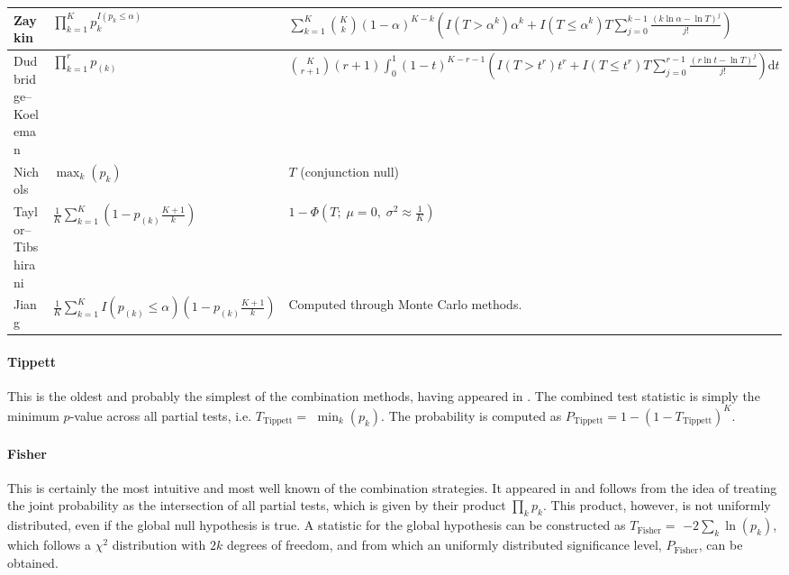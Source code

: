 \begin{sidewaystable}
\begin{center}
{\begin{tabular}{@{}m{3.6cm}@{}m{6.7cm}<{\raggedright}@{}m{12.2cm}<{\raggedright}@{}}
Zaykin &
$\prod_{k=1}^{K} p_{k}^{I\left(p_{k} \leqslant \alpha\right)}$ &
$\sum_{k=1}^{K}\binom{K}{k}\left(1-\alpha\right)^{K-k}\left(I\left(T> \alpha^{k}\right) \alpha^{k}  + I\left(T\leqslant \alpha^{k}\right)T\sum_{j=0}^{k-1}\frac{\left(k\ln \alpha - \ln T\right)^{j}}{j!}\right)$\\
\midrule[0pt]
Dudbridge--Koeleman &
$\prod_{k=1}^{r} p_{(k)}$ &
$\binom{K}{r+1}\left(r+1\right) \int_0^1\left(1-t\right)^{K-r-1}\left(I\left(T> t^{r}\right) t^{r} +I\left(T \leqslant t^{r}\right) T \sum_{j=0}^{r-1}\frac{\left(r\ln t - \ln T\right)^{j}}{j!}\right)\mathrm{d}t$ \\
\midrule[0pt]
Nichols &
$\max_{k} \left(p_{k}\right)$ &
$T$ (conjunction null)\\
\midrule[0pt]
Taylor--Tibshirani &
$\frac{1}{K} \sum_{k=1}^{K} \left(1-p_{(k)}\frac{K+1}{k}\right)$ &
$1-\Phi\left(T;\;\mu=0,\;\sigma^2 \approx \frac{1}{K}\right)$ \\
\midrule[0pt]
Jiang &
$\frac{1}{K} \sum_{k=1}^{K} I\left(p_{(k)}\leqslant \alpha \right)\left(1-p_{(k)}\frac{K+1}{k}\right)$ &
Computed through Monte Carlo methods.\\
\bottomrule
\end{tabular}}
\end{center}
\end{sidewaystable}

\paragraph{Tippett} This is the oldest and probably the simplest of the combination methods, having appeared in \citet{Tippett1931}. The combined test statistic is simply the minimum $p$-value across all partial tests, i.e. $T_{\text{Tippett}} =$ $\min_{k} \left(p_{k}\right)$. The probability is computed as $P_{\text{Tippett}} = 1-\left(1-T_{\text{Tippett}}\right)^{K}$.

\paragraph{Fisher} This is certainly the most intuitive and most well known of the combination strategies. It appeared in \citet{Fisher1932} and follows from the idea of treating the joint probability as the intersection of all partial tests, which is given by their product $\prod_{k} p_{k}$. This product, however, is not uniformly distributed, even if the global null hypothesis is true. A statistic for the global hypothesis can be constructed as $T_{\text{Fisher}} =$ $-2 \sum_{k} \ln\left(p_{k}\right)$, which follows a $\chi^2$ distribution with $2k$ degrees of freedom, and from which an uniformly distributed significance level, $P_{\text{Fisher}}$, can be obtained.

